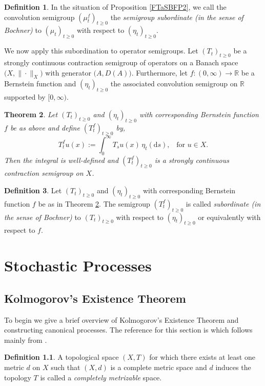 \documentclass[a4paper, 12pt]{report}
\newtheorem{theorem}{Theorem}[section]
\theoremstyle{remark}
\theoremstyle{definition}
\newtheorem{definition}[theorem]{Definition}
\begin{document}
\begin{definition}
In the situation of Proposition \ref{FTaSBFP2}, we call the convolution semigroup $(\mu_t^f)_{t \ge 0}$ the \emph{semigroup subordinate (in the sense of Bochner)} to $(\mu_t)_{t \ge 0}$ with respect to $(\eta_t)_{t \ge 0}$.
\end{definition}

We now apply this subordination to operator semigroups.  Let $(T_t)_{t \ge 0}$ be a strongly continuous contraction semigroup of operators on a Banach space $\big(X, \|\cdot\|_X)$ with generator $\big(A, D(A)\big)$.  Furthermore, let $f : (0, \infty) \to \mathbb{R}$ be a Bernstein function and $(\eta_t)_{t \ge 0}$ the associated convolution semigroup on $\mathbb{R}$ supported by $[0, \infty)$.
\begin{theorem}\label{FTaSBFT2}
Let $(T_t)_{t \ge 0}$ and $(\eta_t)_{t \ge 0}$ with corresponding Bernstein function $f$ be as above and define $(T_t^f)_{t \ge 0}$ by,
\begin{equation}
T_t^fu(x) := \int_0^\infty T_su(x)\,\eta_t(\mathrm{d}s), \,\,\,\,\, \text{for } u \in X.
\end{equation}
Then the integral is well-defined and $(T_t^f)_{t \ge 0}$ is a strongly continuous contraction semigroup on $X$.
\end{theorem}

\begin{definition}
Let $(T_t)_{t \ge 0}$ and $(\eta_t)_{t \ge 0}$ with corresponding Bernstein function $f$ be as in Theorem \ref{FTaSBFT2}.  The semigroup $(T_t^f)_{t \ge 0}$ is called \emph{subordinate (in the sense of Bochner)} to $(T_t)_{t \ge 0}$ with respect to $(\eta_t)_{t \ge 0}$ or equivalently with respect to $f$.
\end{definition}


\chapter{Stochastic Processes}\label{Ch.oSP}

\section{Kolmogorov's Existence Theorem}\label{Se.KEThm}

To begin we give a brief overview of Kolmogorov's Existence Theorem and constructing canonical processes.  The reference for this section is \cite{Vol3} which follows mainly from \cite{SPRef}.

\begin{definition}
A topological space $(X, T)$ for which there exists at least one metric $d$ on $X$ such that $(X, d)$ is a complete metric space and $d$ induces the topology $T$ is called a \emph{completely metrizable} space.
\end{definition}
\end{document}
